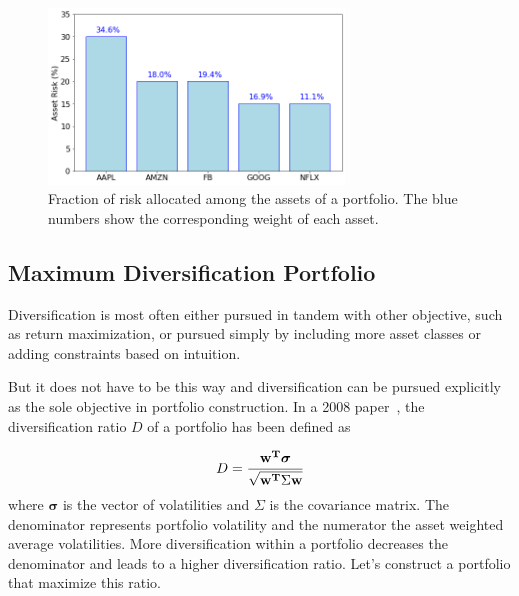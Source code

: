 \begin{figure}[htb]
	\centering
	\includegraphics[width=0.7\textwidth]{figures/risk_allocation}
	\caption{Fraction of risk allocated among the assets of a portfolio. The blue numbers show the corresponding weight of each asset.}
	\label{fig:risk_allocation}
\end{figure}

\subsection{Maximum Diversification Portfolio}
\label{maximum-diversification-portfolio}

Diversification is most often either pursued in tandem with other objective, such as return maximization, or pursued simply by including more asset classes or adding constraints based on intuition.

But it does not have to be this way and diversification can be pursued explicitly as the sole objective in portfolio construction.
In a 2008 paper~\cite{bib:diversification}, the diversification ratio $D$ of a portfolio has been defined as

\begin{equation}
D=\cfrac{\mathbf{w^T}\boldsymbol{\sigma}}{\sqrt {\mathbf{w^T}\Sigma \mathbf{w}}} 
\end{equation}
where $\boldsymbol{\sigma}$ is the vector of volatilities and $\Sigma$ is the covariance matrix. The denominator represents portfolio volatility and the numerator the asset weighted average volatilities. More diversification within a portfolio decreases the denominator and leads to a higher diversification ratio.
Let's construct a portfolio that maximize this ratio.

